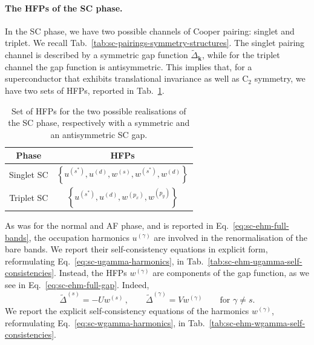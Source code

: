 \paragraph{The HFPs of the SC phase.}

In the SC phase, we have two possible channels of Cooper pairing: singlet and triplet. We recall Tab.~\ref{tab:sc-pairings-symmetry-structures}. The singlet pairing channel is described by a symmetric gap function $\tilde{\Delta}_\mathbf{k}$, while for the triplet channel the gap function is antisymmetric. This implies that, for a superconductor that exhibits translational invariance as well as $\mathrm{C}_2$ symmetry, we have two sets of HFPs, reported in Tab.~\ref{tab:sc-ssc-tsc-hfps}.

\begin{table}
	\centering
	\begin{tabular}{c c}
		\textbf{Phase} & \textbf{HFPs} \\
		\midrule
		Singlet SC & $\left\lbrace 
		u^{(s^*)}, u^{(d)}, w^{(s)}, w^{(s^*)}, w^{(d)}
		\right\rbrace$ \\[0.7em]
		Triplet SC & $\left\lbrace
		u^{(s^*)}, u^{(d)}, w^{(p_x)}, w^{(p_y)}
		\right\rbrace$ \\
		\midrule
	\end{tabular}
	\caption{Set of HFPs for the two possible realisations of the SC phase, respectively with a symmetric and an antisymmetric SC gap.}
	\label{tab:sc-ssc-tsc-hfps}
\end{table}

As was for the normal and AF phase, and is reported in Eq.~\eqref{eq:sc-ehm-full-bands}, the occupation harmonics $u^{(\gamma)}$ are involved in the renormalisation of the bare bands. We report their self-consistency equations in explicit form, reformulating Eq.~\eqref{eq:sc-ugamma-harmonics}, in Tab.~\ref{tab:sc-ehm-ugamma-self-consistencies}. Instead, the HFPs $w^{(\gamma)}$ are components of the gap function, as we see in Eq.~\eqref{eq:sc-ehm-full-gap}. Indeed,
\[
	\tilde{\Delta}^{(s)} = -U w^{(s)} \, ,
	\qquad
	\tilde{\Delta}^{(\gamma)} = V w^{(\gamma)}
	\qquad
	\text{for $\gamma \neq s$.}
\]
We report the explicit self-consistency equations of the harmonics $w^{(\gamma)}$, reformulating Eq.~\eqref{eq:sc-wgamma-harmonics}, in Tab.~\ref{tab:sc-ehm-wgamma-self-consistencies}.

